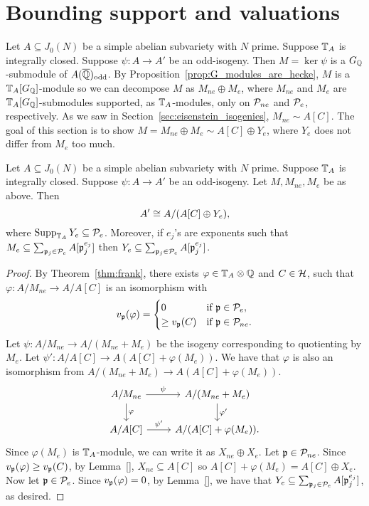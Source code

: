 \documentclass[thesis.tex]{subfiles}
\begin{document}
\section{Bounding support and valuations}%
\label{sec:bounding_support_and_valuations}

Let $A\subseteq J_0(N)$ be a simple abelian subvariety with $N$ prime. Suppose
$\TT_A$ is integrally closed. Suppose $\psi:A\to A'$ be an odd-isogeny. Then
$M=\ker\psi$ is a $G_\QQ$-submodule of $A(\QQbar)_\odd$. By
Proposition~\ref{prop:G_modules_are_hecke}, $M$ is a $\TT_A[G_\QQ]$-module so
we can decompose $M$ as $M_{ne}\oplus M_e$, where $M_{ne}$ and $M_e$ are
$\TT_A[G_\QQ]$-submodules supported, as $\TT_A$-modules, only on $\P_{ne}$ and
$\P_e$, respectively. As we saw in Section~\ref{sec:eisenstein_isogenies},
$M_{ne}\sim A[C]$. The goal of this section is to show $M=M_{ne}\oplus M_e\sim
A[C]\oplus Y_e$, where $Y_e$ does not differ from $M_e$ too much.

\begin{proposition}
    Let $A\subseteq J_0(N)$ be a simple abelian subvariety with $N$ prime.
    Suppose $\TT_A$ is integrally closed. Suppose $\psi:A\to A'$ be an
    odd-isogeny. Let $M, M_{ne}, M_e$ be as above. Then
    \[
        A'\isom A/(A[C]\oplus Y_e),
    \]
    where $\Supp_{\TT_A} Y_e\subseteq \P_e$. Moreover, if $e_j$'s are exponents
    such that $M_e\subseteq \sum_{\p_j\in \P_e} A[\p_j ^{e_j}]$ then
    $Y_e\subseteq \sum_{\p_j \in \P_e} A[\p_j ^{e_j}]$.
\end{proposition}
\begin{proof}
    By Theorem~\ref{thm:frank}, there exists $\varphi\in \TT_A\otimes \QQ$ and
    $C\in \H$, such that $\varphi:A/M_{ne}\to A/A[C]$ is an isomorphism with
    \[
        v_\p(\varphi) =
        \begin{cases}
            0            & \text{if } \p\in \P_e, \\
            \geq v_\p(C) & \text{if } \p\in \P_{ne}.
        \end{cases}
    \]
    Let $\psi:A/M_{ne}\to A/(M_{ne}+M_e)$ be the isogeny corresponding to
    quotienting by $M_e$. Let $\psi':A/A[C]\to A(A[C]+\varphi(M_e))$. We have
    that $\varphi$ is also an isomorphism from $A/(M_{ne}+M_e)\to
    A(A[C]+\varphi(M_e))$. 
    \[
        \begin{tikzcd}
            A/M_{ne}
            \arrow[r, "\psi"]
            \arrow[d, "\varphi"]
            &
            A/(M_{ne}+M_e)
            \arrow[d, "\varphi'"]
            \\
            A/A[C]
            \arrow[r, "\psi'"]
            &
            A/(A[C]+\varphi(M_e)).
        \end{tikzcd}
    \] 
    Since $\varphi(M_e)$ is $\TT_A$-module, we can write it as $X_{ne}\oplus
    X_e$. Let $\p\in \P_{ne}$. Since $v_\p(\varphi)\geq v_\p(C)$, by
    Lemma~\ref{}, $X_{ne}\subseteq A[C]$ so $A[C]+\varphi(M_e) = A[C]\oplus
    X_e$. Now let $\p\in \P_e$. Since $v_\p(\varphi)=0$, by Lemma~\ref{}, we
    have that $Y_e\subseteq \sum_{\p_j \in \P_e} A[\p_j ^{e_j}]$, as desired.
\end{proof}
\end{document}

